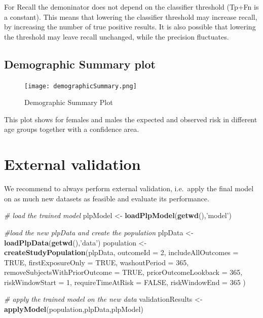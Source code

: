 \documentclass[]{article}
\newenvironment{Shaded}{\begin{snugshade}}{\end{snugshade}}
\newcommand{\KeywordTok}[1]{\textcolor[rgb]{0.13,0.29,0.53}{\textbf{#1}}}
\newcommand{\DataTypeTok}[1]{\textcolor[rgb]{0.13,0.29,0.53}{#1}}
\newcommand{\DecValTok}[1]{\textcolor[rgb]{0.00,0.00,0.81}{#1}}
\newcommand{\StringTok}[1]{\textcolor[rgb]{0.31,0.60,0.02}{#1}}
\newcommand{\CommentTok}[1]{\textcolor[rgb]{0.56,0.35,0.01}{\textit{#1}}}
\newcommand{\OtherTok}[1]{\textcolor[rgb]{0.56,0.35,0.01}{#1}}
\newcommand{\NormalTok}[1]{#1}
\begin{document}
For Recall the demoninator does not depend on the classifier threshold
(Tp+Fn is a constant). This means that lowering the classifier threshold
may increase recall, by increasing the number of true positive results.
It is also possible that lowering the threshold may leave recall
unchanged, while the precision fluctuates.

\newpage

\subsection{Demographic Summary plot}\label{demographic-summary-plot}

\begin{figure}
\centering
\texttt{[image: demographicSummary.png]}
\caption{Demographic Summary Plot}
\end{figure}

This plot shows for females and males the expected and observed risk in
different age groups together with a confidence area.

\newpage

\section{External validation}\label{external-validation}

We recommend to always perform external validation, i.e.~apply the final
model on as much new datasets as feasible and evaluate its performance.

\begin{Shaded}
\begin{Highlighting}[]
\CommentTok{# load the trained model}
\NormalTok{plpModel <-}\StringTok{ }\KeywordTok{loadPlpModel}\NormalTok{(}\KeywordTok{getwd}\NormalTok{(),}\StringTok{'model'}\NormalTok{)}

\CommentTok{#load the new plpData and create the population}
\NormalTok{plpData <-}\StringTok{ }\KeywordTok{loadPlpData}\NormalTok{(}\KeywordTok{getwd}\NormalTok{(),}\StringTok{'data'}\NormalTok{)}
\NormalTok{population <-}\StringTok{ }\KeywordTok{createStudyPopulation}\NormalTok{(plpData, }
\DataTypeTok{outcomeId =} \DecValTok{2}\NormalTok{, }
\DataTypeTok{includeAllOutcomes =} \OtherTok{TRUE}\NormalTok{, }
\DataTypeTok{firstExposureOnly =} \OtherTok{TRUE}\NormalTok{, }
\DataTypeTok{washoutPeriod =} \DecValTok{365}\NormalTok{, }
\DataTypeTok{removeSubjectsWithPriorOutcome =} \OtherTok{TRUE}\NormalTok{, }
\DataTypeTok{priorOutcomeLookback =} \DecValTok{365}\NormalTok{,}
\DataTypeTok{riskWindowStart =} \DecValTok{1}\NormalTok{,}
\DataTypeTok{requireTimeAtRisk =} \OtherTok{FALSE}\NormalTok{,}
\DataTypeTok{riskWindowEnd =} \DecValTok{365}
\NormalTok{)}

\CommentTok{# apply the trained model on the new data}
\NormalTok{validationResults <-}\StringTok{ }\KeywordTok{applyModel}\NormalTok{(population,plpData,plpModel)}
\end{Highlighting}
\end{Shaded}
\end{document}
